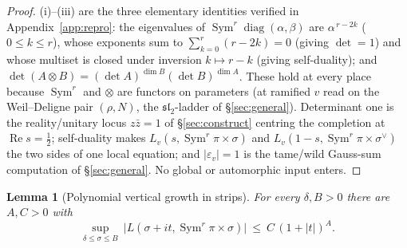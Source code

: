 \documentclass[11pt]{article}
\newtheorem{lemma}[theorem]{Lemma}
\theoremstyle{definition}
\renewcommand{\Re}{\operatorname{Re}}
\newcommand{\Sym}{\operatorname{Sym}}
\begin{document}
\begin{proof}
\textup{(i)}--\textup{(iii)} are the three elementary identities verified in Appendix~\ref{app:repro}:
the eigenvalues of $\Sym^r\operatorname{diag}(\alpha,\beta)$ are $\alpha^{\,r-2k}$ ($0\le k\le r$), whose
exponents sum to $\sum_{k=0}^r(r-2k)=0$ (giving $\det=1$) and whose multiset is closed under inversion
$k\mapsto r-k$ (giving self-duality); and $\det(A\otimes B)=(\det A)^{\dim B}(\det B)^{\dim A}$. These hold
at every place because $\Sym^r$ and $\otimes$ are functors on parameters (at ramified $v$ read on the
Weil--Deligne pair $(\rho,N)$, the $\mathfrak{sl}_2$-ladder of \S\ref{sec:general}). Determinant one is the
reality/unitary locus $z\bar z=1$ of \S\ref{sec:construct} centring the completion at $\Re s=\tfrac12$;
self-duality makes $L_v(s,\Sym^r\pi\times\sigma)$ and $L_v(1-s,\Sym^r\pi\times\sigma^\vee)$ the two sides
of one local equation; and $|\varepsilon_v|=1$ is the tame/wild Gauss-sum computation of
\S\ref{sec:general}. No global or automorphic input enters.
\end{proof}

\begin{lemma}[Polynomial vertical growth in strips]\label{lem:bounded}
For every $\delta,B>0$ there are $A,C>0$ with
\[
  \sup_{\delta\le\sigma\le B}\ \bigl|L(\sigma+it,\Sym^r\pi\times\sigma)\bigr|\ \le\ C\,(1+|t|)^{A}.
\]
\end{lemma}
\end{document}

